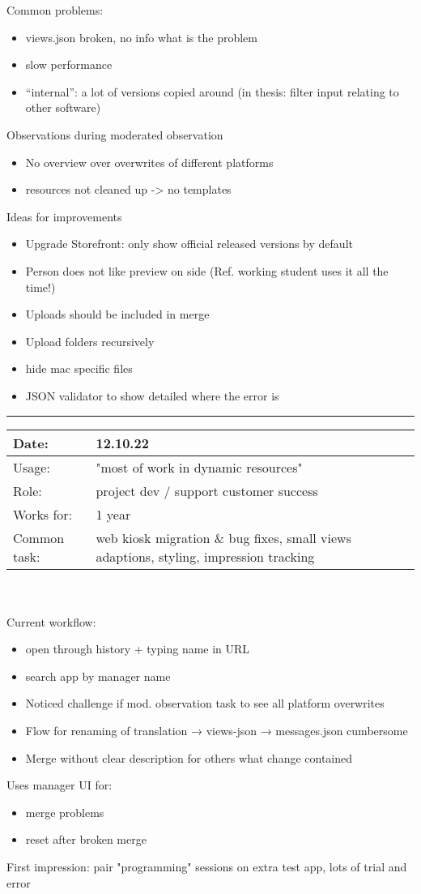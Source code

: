 Common problems:
\begin{itemize}[nosep]
  \item views.json broken, no info what is the problem
  \item slow performance
  \item “internal”: a lot of versions copied around (in thesis: filter input relating to other software)
\end{itemize}

Observations during moderated observation
\begin{itemize}[nosep]
  \item No overview over overwrites of different platforms
  \item resources not cleaned up -> no templates
\end{itemize}

Ideas for improvements
\begin{itemize}[nosep]
  \item Upgrade Storefront: only show official released versions by default
  \item Person does not like preview on side (Ref. working student uses it all the time!)
  \item Uploads should be included in merge
  \item Upload folders recursively
  \item hide mac specific files
  \item JSON validator to show detailed where the error is
\end{itemize}
\bigskip
\hrule

\begin{tabularx}{\linewidth}{lX}
  Date: & 12.10.22 \\
  \hline
  Usage: & "most of work in dynamic resources"\\
  \hline
  Role: & project dev / support customer success \\
  \hline
  Works for: & 1 year \\
  \hline
  Common task: &  web kiosk migration \& bug fixes, small views adaptions, styling, impression tracking
\end{tabularx}
\\\\
Current workflow:
\begin{itemize}[nosep]
  \item open through history + typing name in URL
  \item search app by manager name
  \item Noticed challenge if mod. observation task to see all platform overwrites
  \item Flow for renaming of translation → views-json → messages.json cumbersome
  \item Merge without clear description for others what change contained
\end{itemize}
Uses manager UI for:
\begin{itemize}[nosep]
  \item merge problems
  \item reset after broken merge
\end{itemize}
First impression: pair "programming" sessions on extra test app, lots of trial and error

